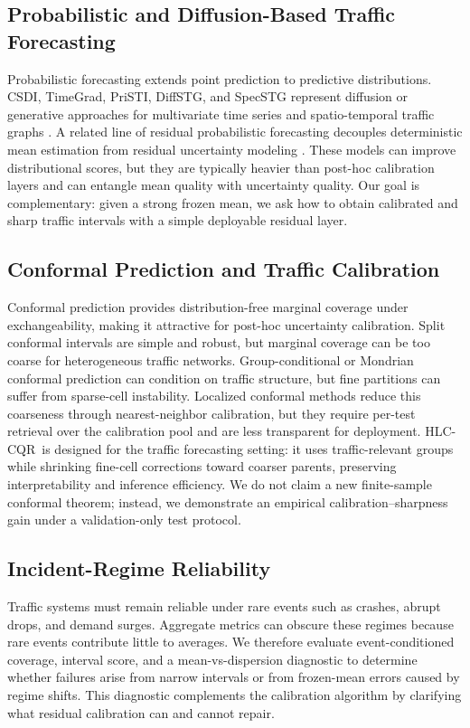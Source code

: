 \documentclass[letterpaper,journal]{IEEEtran}
\newcommand{\hlc}{HLC-CQR}
\begin{document}
\subsection{Probabilistic and Diffusion-Based Traffic Forecasting}
Probabilistic forecasting extends point prediction to predictive distributions. CSDI, TimeGrad, PriSTI, DiffSTG, and SpecSTG represent diffusion or generative approaches for multivariate time series and spatio-temporal traffic graphs \cite{tashiro2021csdi,rasul2021timegrad,liu2023pristi,wen2023diffstg,lin2024specstg}. A related line of residual probabilistic forecasting decouples deterministic mean estimation from residual uncertainty modeling \cite{han2022card,lai2025rdit,wang2025falda,qi2026diffusionresidual}. These models can improve distributional scores, but they are typically heavier than post-hoc calibration layers and can entangle mean quality with uncertainty quality. Our goal is complementary: given a strong frozen mean, we ask how to obtain calibrated and sharp traffic intervals with a simple deployable residual layer.

\subsection{Conformal Prediction and Traffic Calibration}
Conformal prediction provides distribution-free marginal coverage under exchangeability, making it attractive for post-hoc uncertainty calibration. Split conformal intervals are simple and robust, but marginal coverage can be too coarse for heterogeneous traffic networks. Group-conditional or Mondrian conformal prediction can condition on traffic structure, but fine partitions can suffer from sparse-cell instability. Localized conformal methods reduce this coarseness through nearest-neighbor calibration, but they require per-test retrieval over the calibration pool and are less transparent for deployment. \hlc\ is designed for the traffic forecasting setting: it uses traffic-relevant groups while shrinking fine-cell corrections toward coarser parents, preserving interpretability and inference efficiency. We do not claim a new finite-sample conformal theorem; instead, we demonstrate an empirical calibration--sharpness gain under a validation-only test protocol.

\subsection{Incident-Regime Reliability}
Traffic systems must remain reliable under rare events such as crashes, abrupt drops, and demand surges. Aggregate metrics can obscure these regimes because rare events contribute little to averages. We therefore evaluate event-conditioned coverage, interval score, and a mean-vs-dispersion diagnostic to determine whether failures arise from narrow intervals or from frozen-mean errors caused by regime shifts. This diagnostic complements the calibration algorithm by clarifying what residual calibration can and cannot repair.
\end{document}
